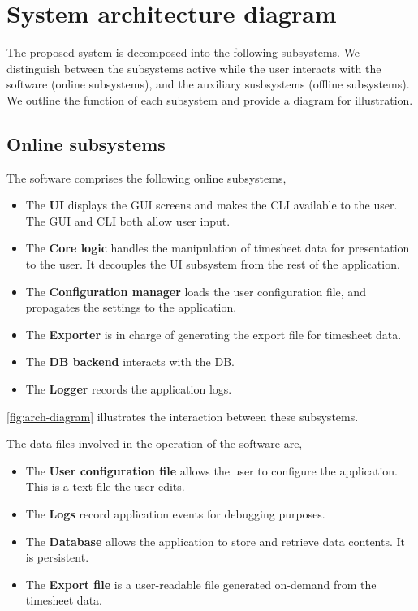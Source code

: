 \section{System architecture diagram} \label{sec:system-diagram}
The proposed system is decomposed into the following subsystems. We distinguish
between the subsystems active while the user interacts with the software (online
subsystems), and the auxiliary susbsystems (offline subsystems). We outline
the function of each subsystem and provide a diagram for illustration.

\subsection{Online subsystems}
The software comprises the following online subsystems,
\begin{itemize}
\item The \textbf{\gls{UI}} displays the \gls{GUI} screens and makes the
  \gls{CLI} available to the user. The \gls{GUI} and \gls{CLI} both allow
  user input.
\item The \textbf{Core logic} handles the manipulation of timesheet data for
  presentation to the user. It decouples the \gls{UI} subsystem from the rest
  of the application.
\item The \textbf{Configuration manager} loads the user configuration file, and
  propagates the settings to the application.
\item The \textbf{Exporter} is in charge of generating the export file
  for timesheet data.
\item The \textbf{\gls{DB} backend} interacts with the \gls{DB}.
\item The \textbf{Logger} records the application logs.
\end{itemize}

\cref{fig:arch-diagram} illustrates the interaction between these
subsystems.

The data files involved in the operation of the software are,
\begin{itemize}
\item The \textbf{User configuration file} allows the user to configure the
  application. This is a text file the user edits.
\item The \textbf{Logs} record application events for debugging purposes.
\item The \textbf{Database} allows the application to store and retrieve
  data contents. It is persistent.
\item The \textbf{Export file} is a user-readable file generated on-demand
  from the timesheet data.
\end{itemize}

